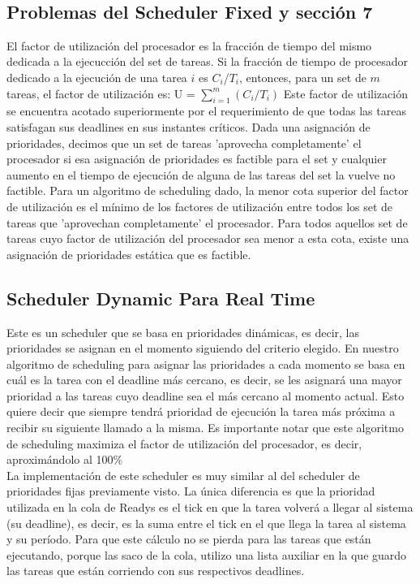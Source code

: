 \\

\subsection{Problemas del Scheduler Fixed y sección 7}
El factor de utilización del procesador es la fracción de tiempo del mismo dedicada a la ejecucción del set de tareas. Si la fracción de tiempo de procesador dedicado a la ejecución de una tarea $i$ es $C_i$/$T_i$, entonces, para un set de $m$ tareas, el factor de utilización es:
 U = $\sum_{i=1}^{m} (C_{i}/T_{i})$
Este factor de utilización se encuentra acotado superiormente por el requerimiento de que todas las tareas satisfagan sus deadlines en sus instantes críticos. Dada una asignación de prioridades, decimos que un set de tareas 'aprovecha completamente' el procesador si esa asignación de prioridades es factible para el set y cualquier aumento en el tiempo de ejecución de alguna de las tareas del set la vuelve no factible. Para un algoritmo de scheduling dado, la menor cota superior del factor de utilización es el mínimo de los factores de utilización entre todos los set de tareas que 'aprovechan completamente' el procesador. Para todos aquellos set de tareas cuyo factor de utilización del procesador sea menor a esta cota, existe una asignación de prioridades estática que es factible.


\subsection{Scheduler Dynamic Para Real Time}
Este es un scheduler que se basa en prioridades dinámicas, es decir, las prioridades se asignan en el momento siguiendo del criterio elegido. En nuestro algoritmo de scheduling para asignar las prioridades a cada momento se basa en cuál es la tarea con el deadline más cercano, es decir, se les asignará una mayor prioridad a las tareas cuyo deadline sea el más cercano al momento actual. Esto quiere decir que siempre tendrá prioridad de ejecución la tarea más próxima a recibir su siguiente llamado a la misma. Es importante notar que este algoritmo de scheduling maximiza el factor de utilización del procesador, es decir, aproximándolo al 100\%
\\
La implementación de este scheduler es muy similar al del scheduler de prioridades fijas previamente visto. La única diferencia es que la prioridad utilizada en la cola de Readys es el tick en que la tarea volverá a llegar al sistema (su deadline), es decir, es la suma entre el tick en el que llega la tarea al sistema y su período. Para que este cálculo no se pierda para las tareas que están ejecutando, porque las saco de la cola, utilizo una lista auxiliar en la que guardo las tareas que están corriendo con sus respectivos deadlines.
\\

